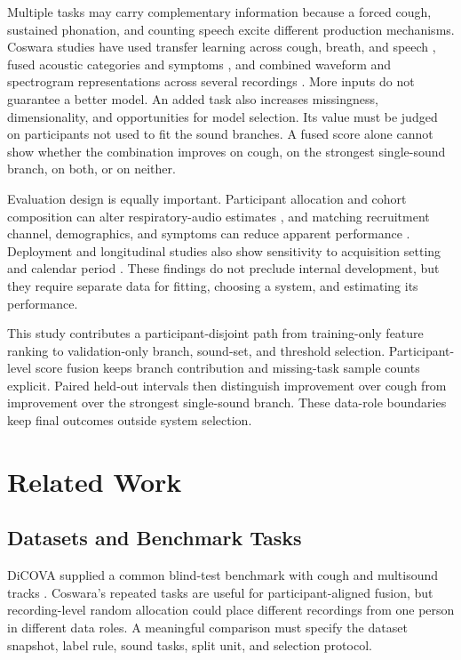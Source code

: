 \documentclass[conference]{IEEEtran}
\begin{document}
Multiple tasks may carry complementary information because a forced cough,
sustained phonation, and counting speech excite different production
mechanisms. Coswara studies have used transfer learning across cough, breath,
and speech \cite{pahar2022transfer}, fused acoustic categories and symptoms
\cite{chetupalli2023multimodal}, and combined waveform and spectrogram
representations across several recordings \cite{truong2024fair}. More inputs do
not guarantee a better model. An added task also increases missingness,
dimensionality, and opportunities for model selection. Its value must be judged
on participants not used to fit the sound branches. A fused score alone cannot
show whether the combination improves on cough, on the strongest single-sound
branch, on both, or on neither.

Evaluation design is equally important. Participant allocation and cohort
composition can alter respiratory-audio estimates \cite{han2022realistic}, and
matching recruitment channel, demographics, and symptoms can reduce apparent
performance \cite{coppock2024audio}. Deployment and longitudinal studies also
show sensitivity to acquisition setting and calendar period
\cite{grant2022deployment,kim2024longitudinal,ganitidis2025drift}. These findings
do not preclude internal development, but they require separate data for
fitting, choosing a system, and estimating its performance.

This study contributes a participant-disjoint path from training-only feature
ranking to validation-only branch, sound-set, and threshold selection.
Participant-level score fusion keeps branch contribution and missing-task sample
counts explicit. Paired held-out intervals then distinguish improvement over
cough from improvement over the strongest single-sound branch. These data-role
boundaries keep final outcomes outside system selection.

\section{Related Work}

\subsection{Datasets and Benchmark Tasks}

DiCOVA supplied a common blind-test benchmark with cough and multisound tracks
\cite{muguli2021dicova}. Coswara's repeated tasks are useful for
participant-aligned fusion, but recording-level random allocation could place
different recordings from one person in different data roles. A meaningful
comparison must specify the
dataset snapshot, label rule, sound tasks, split unit, and selection protocol.
\end{document}
